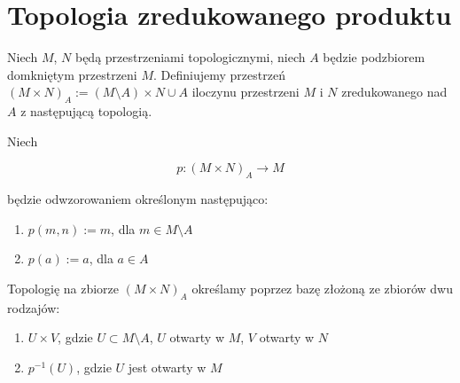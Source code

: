\section{Topologia zredukowanego produktu}
\begin{df}
  Niech $M$, $N$ będą przestrzeniami topologicznymi, niech $A$ będzie podzbiorem domkniętym przestrzeni $M$. Definiujemy przestrzeń $(M \times N)_A := (M \setminus A) \times N \cup A$ iloczynu przestrzeni $M$ i $N$ zredukowanego nad $A$ z następującą topologią.
  
  Niech
  
  \[p: (M \times N)_A \rightarrow M\]
  
  będzie odwzorowaniem określonym następująco:
  \begin{enumerate}
   \item $p(m, n) := m$, dla $m \in M \setminus A$
   \item $p(a) := a$, dla $a \in A$
  \end{enumerate}
  
  Topologię na zbiorze $(M \times N)_A$ określamy poprzez bazę złożoną ze zbiorów dwu rodzajów:
  \begin{enumerate}
   \item $U \times V$, gdzie $U \subset M \setminus A$, $U$ otwarty w $M$, $V$ otwarty w $N$
   \item $p^{-1}(U)$, gdzie $U$ jest otwarty w $M$
  \end{enumerate}
\end{df}


